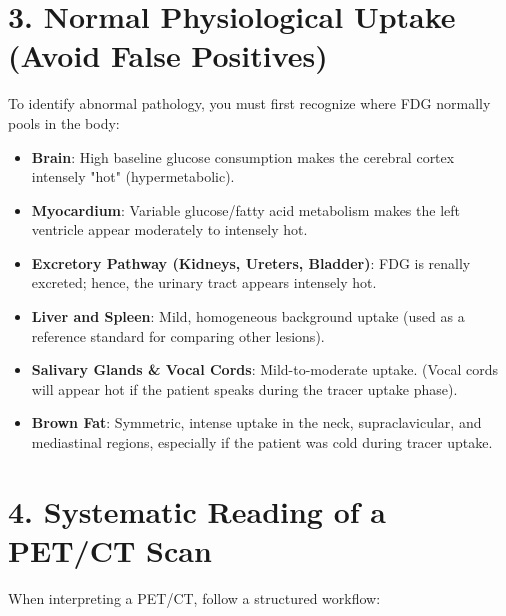 \section*{3. Normal Physiological Uptake (Avoid False Positives)}
To identify abnormal pathology, you must first recognize where FDG normally pools in the body:

\begin{itemize}
    \item \textbf{Brain}: High baseline glucose consumption makes the cerebral cortex intensely "hot" (hypermetabolic).
    \item \textbf{Myocardium}: Variable glucose/fatty acid metabolism makes the left ventricle appear moderately to intensely hot.
    \item \textbf{Excretory Pathway (Kidneys, Ureters, Bladder)}: FDG is renally excreted; hence, the urinary tract appears intensely hot.
    \item \textbf{Liver and Spleen}: Mild, homogeneous background uptake (used as a reference standard for comparing other lesions).
    \item \textbf{Salivary Glands \& Vocal Cords}: Mild-to-moderate uptake. (Vocal cords will appear hot if the patient speaks during the tracer uptake phase).
    \item \textbf{Brown Fat}: Symmetric, intense uptake in the neck, supraclavicular, and mediastinal regions, especially if the patient was cold during tracer uptake.
\end{itemize}


\section*{4. Systematic Reading of a PET/CT Scan}
When interpreting a PET/CT, follow a structured workflow:

